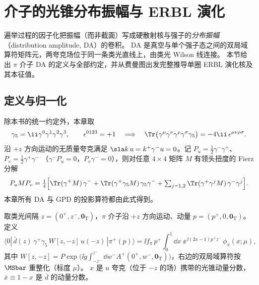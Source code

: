 \section{介子的光锥分布振幅与 ERBL 演化}\label{sec:cex-da}

遍举过程的因子化把振幅（而非截面）写成硬散射核与强子的\emph{分布振幅}（distribution amplitude, DA）的卷积。
DA 是真空与单个强子态之间的双局域算符矩阵元，两夸克场位于同一条类光直线上，由类光 Wilson 线连接。
本节给出 $\pi$ 介子 DA 的定义与全部约定，并从费曼图出发完整推导单圈 ERBL 演化核及其本征值。

\subsection{定义与归一化}

除本书的统一约定外，本章取
\begin{equation}\label{eq:cex-gamma5}
\gamma_5=\ii\gamma^0\gamma^1\gamma^2\gamma^3,\qquad \epsilon^{0123}=+1\quad\Longrightarrow\quad
\Tr\big(\gamma^\mu\gamma^\nu\gamma^\rho\gamma^\sigma\gamma_5\big)=-4\ii\,\epsilon^{\mu\nu\rho\sigma}.
\end{equation}
沿 $+z$ 方向运动的无质量夸克满足 $\sla k\,u=k^+\gamma^-u=0$。记 $P_u=\tfrac12\gamma^-\gamma^+$、$P_v=\tfrac12\gamma^+\gamma^-$
（$\gamma^-P_u=0$，$P_v\gamma^-=0$），则对任意 $4\times4$ 矩阵 $M$ 有领头扭度的 Fierz 分解
\begin{equation}\label{eq:cex-fierz}
P_u M P_v=\tfrac14\Big[\Tr(\gamma^+M)\,\gamma^-+\Tr(\gamma^+\gamma_5M)\,\gamma_5\gamma^-+\textstyle\sum_{j=1,2}\Tr(\gamma^+\gamma^jM)\,\gamma^-\gamma^j\Big].
\end{equation}
本章所有 DA 与 GPD 的投影算符都由此式得到。

\begin{definition}[$\pi$ 介子的领头扭度分布振幅]\label{def:cex-da}
取类光间隔 $z=(0^+,z^-,\bm 0_{\mathrm T})$，$\pi$ 介子沿 $+z$ 方向运动、动量 $p=(p^+,0,\bm 0_{\mathrm T})$。定义
\begin{equation}\label{eq:cex-da}
\langle 0|\,\bar d(z)\,\gamma^+\gamma_5\,W[z,-z]\,u(-z)\,|\pi^+(p)\rangle
= \ii f_\pi\,p^+\int_0^1\!\dd x\;\ee^{\,\ii(2x-1)p^+z^-}\,\phi_\pi(x;\mu),
\end{equation}
其中 $W[z,-z]=P\exp\big(\ii g\int_{-z^-}^{z^-}\dd w^-A^+(0^+,w^-,\bm 0_{\mathrm T})\big)$，右边的双局域算符按 $\MSbar$ 重整化（标度 $\mu$）。
$x$ 是 $u$ 夸克（位于 $-z$ 的场）携带的光锥动量分数，$\bar x\equiv1-x$ 是 $\bar d$ 的动量分数。
\end{definition}

